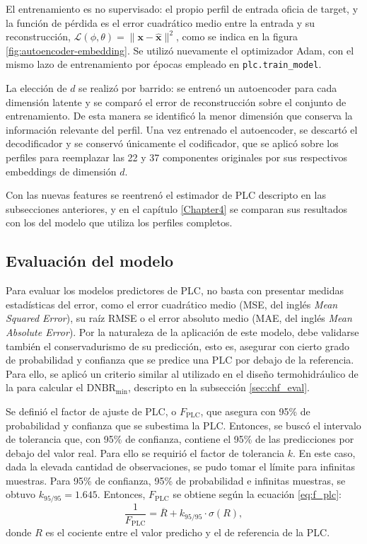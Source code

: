 El entrenamiento es no supervisado: el propio perfil de entrada oficia de target, y la función de pérdida es el error cuadrático medio entre la entrada y su reconstrucción, $\mathcal{L}(\phi,\theta)=\lVert\mathbf{x}-\hat{\mathbf{x}}\rVert^{2}$, como se indica en la figura \ref{fig:autoencoder-embedding}. Se utilizó nuevamente el optimizador Adam, con el mismo lazo de entrenamiento por épocas empleado en \texttt{plc.train\_model}.

La elección de $d$ se realizó por barrido: se entrenó un autoencoder para cada dimensión latente y se comparó el error de reconstrucción sobre el conjunto de entrenamiento. De esta manera se identificó la menor dimensión que conserva la información relevante del perfil. Una vez entrenado el autoencoder, se descartó el decodificador y se conservó únicamente el codificador, que se aplicó sobre los perfiles para reemplazar las 22 y 37 componentes originales por sus respectivos embeddings de dimensión $d$. 

Con las nuevas features se reentrenó el estimador de PLC descripto en las subsecciones anteriores, y en el capítulo \ref{Chapter4} se comparan sus resultados con los del modelo que utiliza los perfiles completos. 


\subsection{Evaluación del modelo}
\label{sec:plc_evaluacion}
Para evaluar los modelos predictores de PLC, no basta con presentar medidas estadísticas del error, como el error cuadrático medio (MSE, del inglés \textit{Mean Squared Error}), su raíz RMSE o el error absoluto medio (MAE, del inglés \textit{Mean Absolute Error}). Por la naturaleza de la aplicación de este modelo, debe validarse también el conservadurismo de su predicción, esto es, asegurar con cierto grado de probabilidad y confianza que se predice una PLC por debajo de la referencia. Para ello, se aplicó un criterio similar al utilizado en el diseño termohidráulico de la \cna{} para calcular el $\mathrm{DNBR}_\mathrm{min}$, descripto en la subsección \ref{sec:chf_eval}. 

Se definió el factor de ajuste de PLC, o $F_\mathrm{PLC}$, que asegura con 95\% de probabilidad y confianza que se subestima la PLC. Entonces, se buscó el intervalo de tolerancia que, con 95\% de confianza, contiene el 95\% de las predicciones por debajo del valor real. 
Para ello se requirió el factor de tolerancia $k$. En este caso, dada la elevada cantidad de observaciones, se pudo tomar el límite para infinitas muestras. Para 95\% de confianza, 95\% de probabilidad e infinitas muestras, se obtuvo $k_{95/95}=1.645$. Entonces, $F_\mathrm{PLC}$ se obtiene según la ecuación \ref{eq:f_plc}:
\begin{equation}
    \label{eq:f_plc}
    \frac{1}{F_\mathrm{PLC}} = \overline{R} + k_{95/95} \cdot \sigma(R),
\end{equation}
donde $R$ es el cociente entre el valor predicho y el de referencia de la PLC.

